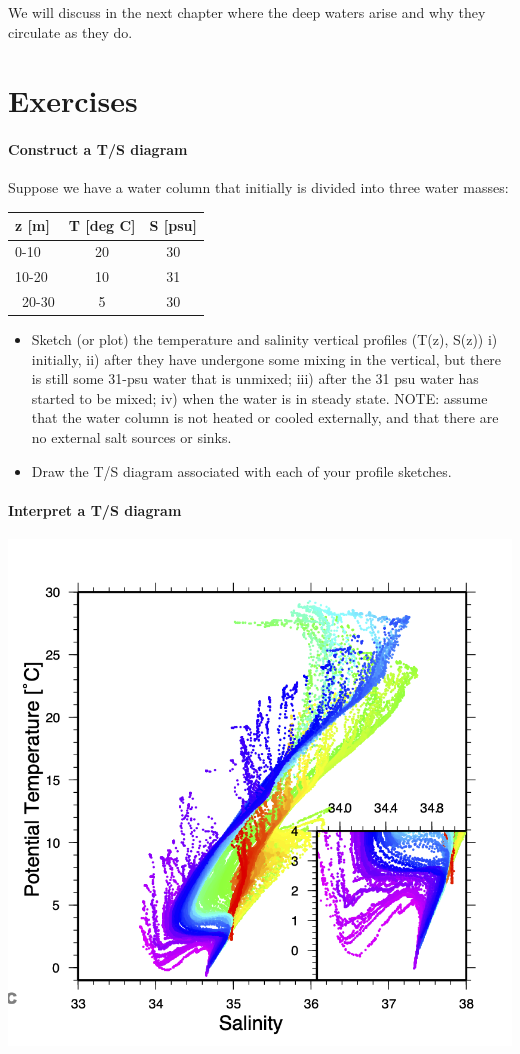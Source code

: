 We will discuss in the next chapter where the deep waters arise and why they circulate as they do.  

\clearpage
\section{Exercises}

\paragraph{Construct a T/S diagram}

Suppose we have a water column that initially is divided into three water masses:

\begin{tabular}{l|cc}
  z [m]& T [deg C]& S [psu]\\
  \hline
  0-10 & 20 & 30\\
  10-20 & 10 &31 \\\
  20-30 & 5 & 30
\end{tabular}

\begin{itemize}
  \item Sketch (or plot) the temperature and salinity vertical profiles (T(z), S(z)) i) initially, ii) after they have undergone some mixing in the vertical, but there is still some 31-psu water that is unmixed; iii) after the 31 psu water has started to be mixed; iv) when the water is in steady state. NOTE: assume that the water column is not heated or cooled externally, and that there are no external salt sources or sinks.
  \item Draw the T/S diagram associated with each of your profile sketches.
\end{itemize}

\paragraph{Interpret a T/S diagram}

\includegraphics{figs/WaterMasses/A16_PvP}

